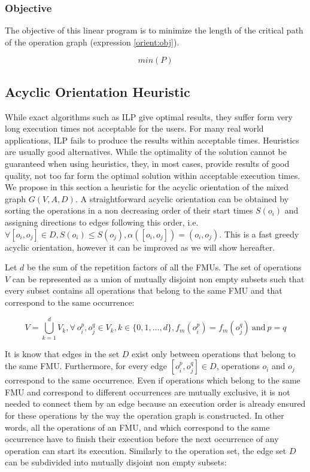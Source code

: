 \subsubsection{Objective}

The objective of this linear program is to minimize the length of the critical path of the operation graph (expression \ref{orient:obj}).

\begin{equation}
min(P)
\label{orient:obj}
\end{equation}


\subsection{Acyclic Orientation Heuristic}

While exact algorithms such as ILP give optimal results, they suffer form very long execution times not acceptable for the users. For many real world applications, ILP fails to produce the results within acceptable times. Heuristics are usually good alternatives. While the optimality of the solution cannot be guaranteed when using heuristics, they, in most cases, provide results of good quality, not too far form the optimal solution within acceptable execution times. We propose in this section a heuristic for the acyclic orientation of the mixed graph $G(V,A,D)$. A straightforward acyclic orientation can be obtained by sorting the operations in a non decreasing order of their start times $S(o_i)$ and assigning directions to edges following this order, i.e. $\forall [o_i,o_j] \in D, S(o_i) \leq S(o_j), \alpha([o_i,o_j]) = (o_i,o_j)$. This is a fast greedy acyclic orientation, however it can be improved as we will show hereafter.

Let $d$ be the sum of the repetition factors of all the FMUs. The set of operations $V$ can be represented as a union of mutually disjoint non empty subsets such that every subset contains all operations that belong to the same FMU and that correspond to the same occurrence:

\begin{equation}
V = \bigcup_{k=1}^d V_k, \forall\ o_i^p, o_j^q \in V_k, k \in \{0, 1, \ldots, d\}, f_m(o_i^p)=f_m(o_j^q)\ \text{and}\ p = q
\label{eq:opsubset}
\end{equation}

It is know that edges in the set $D$ exist only between operations that belong to the same FMU. Furthermore, for every edge $[o_i^p,o_j^q] \in D$, operations $o_i$ and $o_j$ correspond to the same occurrence. Even if operations which belong to the same FMU and correspond to different occurrences are mutually exclusive, it is not needed to connect them by an edge because an execution order is already ensured for these operations by the way the operation graph is constructed. In other words, all the operations of an FMU, and which correspond to the same occurrence have to finish their execution before the next occurrence of any operation can start its execution. Similarly to the operation set, the edge set $D$ can be subdivided into mutually disjoint non empty subsets:

